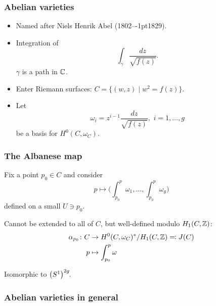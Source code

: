 \begin{frame}
\frametitle{Abelian varieties}

\begin{itemize}
	\item Named after Niels Henrik Abel (1802--\kern-1pt1829).
	\item Integration of
	\[
	\int_\gamma \frac{dz}{\sqrt{f(z)}}.
	\]
	$\gamma$ is a path in $\mathbb{C}$. \pause
	\item Enter Riemann surfaces: $C=\big\{ (w,z) \mid w^2=f(z) \big\}$.
	\item Let 
	\[
	\omega_i = z^{i-1} \frac{dz}{\sqrt{f(z)}}, \, \, i=1,\ldots,g
	\]
	be a basis for $H^0(C,\omega_C)$.
\end{itemize}

\end{frame}


\begin{frame}
\frametitle{The Albanese map}

Fix a point $p_0 \in C$ and consider
\[
p \mapsto \Bigg(
\int_{p_0}^p \omega_1, \ldots,  \int_{p_0}^p \omega_g
\Bigg)
\]
defined on a small $U \ni p_0$.
\pause

Cannot be extended to all of $C$, but well-defined modulo $H_1(C,\mathbb{Z})$:
\begin{align*}
\alpha_{p_0}\colon C &\to H^0(C,\omega_C)^\ast/ H_1(C,\mathbb{Z}) \eqqcolon J(C) \\
p &\mapsto \int_{p_0}^p \omega
\end{align*}

Isomorphic to $\big(S^1\big)^{2g}\mkern-3mu$.
\end{frame}

\begin{frame}
\frametitle{Abelian varieties in general}


\end{frame}

